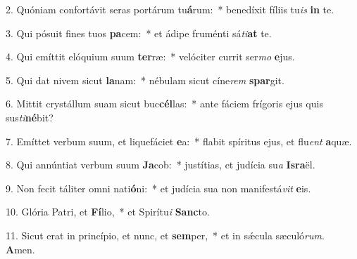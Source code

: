 2. Quóniam confortávit seras portárum tu\textbf{á}rum:~*  benedíxit fíliis tu\textit{is} \textbf{in} te.\

3. Qui pósuit fines tuos \textbf{pa}cem:~*  et ádipe fruménti sá\textit{ti}\textbf{at} te.\

4. Qui emíttit elóquium suum \textbf{ter}ræ:~*  velóciter currit ser\textit{mo} \textbf{e}jus.\

5. Qui dat nivem sicut \textbf{la}nam:~*  nébulam sicut cíne\textit{rem} \textbf{spar}git.\

6. Mittit crystállum suam sicut buc\textbf{cél}las:~*  ante fáciem frígoris ejus quis sus\textit{ti}\textbf{né}bit?\

7. Emíttet verbum suum, et liquefáciet \textbf{e}a:~*  flabit spíritus ejus, et flu\textit{ent} \textbf{a}quæ.\

8. Qui annúntiat verbum suum \textbf{Ja}cob:~*  justítias, et judícia su\textit{a} \textbf{Is}\textbf{ra}ël.\

9. Non fecit táliter omni nati\textbf{ó}ni:~*  et judícia sua non manifestá\textit{vit} \textbf{e}is.\

10. Glória Patri, et \textbf{Fí}lio,~*  et Spirítu\textit{i} \textbf{Sanc}to.\

11. Sicut erat in princípio, et nunc, et \textbf{sem}per,~*  et in sǽcula sæculó\textit{rum}. \textbf{A}men.\

